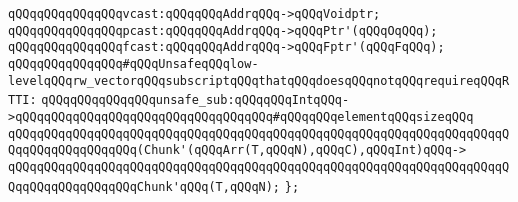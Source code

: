\newline
\verb|qQQqqQQqqQQqqQQqvcast:qQQqqQQqAddrqQQq->qQQqVoidptr;|\newline
\verb|qQQqqQQqqQQqqQQqpcast:qQQqqQQqAddrqQQq->qQQqPtr'(qQQqOqQQq);|\newline
\verb|qQQqqQQqqQQqqQQqfcast:qQQqqQQqAddrqQQq->qQQqFptr'(qQQqFqQQq);|\newline
\newline
\verb|qQQqqQQqqQQqqQQq#qQQqUnsafeqQQqlow-levelqQQqrw_vectorqQQqsubscriptqQQqthatqQQqdoesqQQqnotqQQqrequireqQQqRTTI:|\newline
\verb|qQQqqQQqqQQqqQQqunsafe_sub:qQQqqQQqIntqQQq->qQQqqQQqqQQqqQQqqQQqqQQqqQQqqQQqqQQq#qQQqqQQqelementqQQqsizeqQQq|\newline
\verb|qQQqqQQqqQQqqQQqqQQqqQQqqQQqqQQqqQQqqQQqqQQqqQQqqQQqqQQqqQQqqQQqqQQqqQQqqQQqqQQqqQQqqQQq(Chunk'(qQQqArr(T,qQQqN),qQQqC),qQQqInt)qQQq->|\newline
\verb|qQQqqQQqqQQqqQQqqQQqqQQqqQQqqQQqqQQqqQQqqQQqqQQqqQQqqQQqqQQqqQQqqQQqqQQqqQQqqQQqqQQqqQQqChunk'qQQq(T,qQQqN);|\newline
\verb|};|\newline

